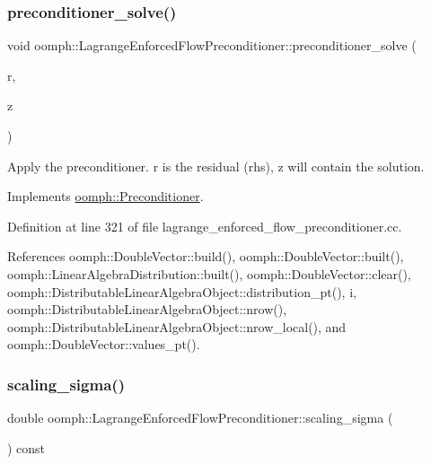 \subsubsection{\texorpdfstring{preconditioner\+\_\+solve()}{preconditioner\_solve()}}
{\footnotesize\ttfamily void oomph\+::\+Lagrange\+Enforced\+Flow\+Preconditioner\+::preconditioner\+\_\+solve (\begin{DoxyParamCaption}\item[{const \hyperlink{classoomph_1_1DoubleVector}{Double\+Vector} \&}]{r,  }\item[{\hyperlink{classoomph_1_1DoubleVector}{Double\+Vector} \&}]{z }\end{DoxyParamCaption})\hspace{0.3cm}{\ttfamily [virtual]}}



Apply the preconditioner. r is the residual (rhs), z will contain the solution. 



Implements \hyperlink{classoomph_1_1Preconditioner_ace1199369e4465cd2b9a34884bb64ec8}{oomph\+::\+Preconditioner}.



Definition at line 321 of file lagrange\+\_\+enforced\+\_\+flow\+\_\+preconditioner.\+cc.



References oomph\+::\+Double\+Vector\+::build(), oomph\+::\+Double\+Vector\+::built(), oomph\+::\+Linear\+Algebra\+Distribution\+::built(), oomph\+::\+Double\+Vector\+::clear(), oomph\+::\+Distributable\+Linear\+Algebra\+Object\+::distribution\+\_\+pt(), i, oomph\+::\+Distributable\+Linear\+Algebra\+Object\+::nrow(), oomph\+::\+Distributable\+Linear\+Algebra\+Object\+::nrow\+\_\+local(), and oomph\+::\+Double\+Vector\+::values\+\_\+pt().

\mbox{\label{classoomph_1_1LagrangeEnforcedFlowPreconditioner_a63ef6de02fbf4486ca99d2a560ff47a4}} 
\subsubsection{\texorpdfstring{scaling\+\_\+sigma()}{scaling\_sigma()}}
{\footnotesize\ttfamily double oomph\+::\+Lagrange\+Enforced\+Flow\+Preconditioner\+::scaling\+\_\+sigma (\begin{DoxyParamCaption}{ }\end{DoxyParamCaption}) const\hspace{0.3cm}{\ttfamily [inline]}}




